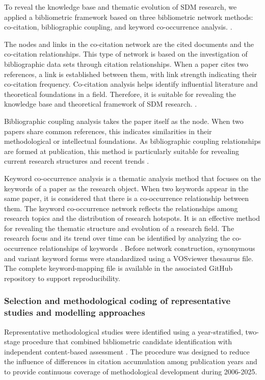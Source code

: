 \documentclass[authoryear,preprint,review,12pt]{elsarticle}
\begin{document}
To reveal the knowledge base and thematic evolution of SDM research, we applied a bibliometric framework based on three bibliometric network methods: co-citation, bibliographic coupling, and keyword co-occurrence analysis. \citep{chen2017science,van2010software,van2014visualizing}.

The nodes and links in the co-citation network are the cited documents and the co-citation relationships. This type of network is based on the investigation of bibliographic data sets through citation relationships. When a paper cites two references, a link is established between them, with link strength indicating their co-citation frequency. Co-citation analysis helps identify influential literature and theoretical foundations in a field. Therefore, it is suitable for revealing the knowledge base and theoretical framework of SDM research. \citep{garfield2002algorithmic,garfield2009science}.

Bibliographic coupling analysis takes the paper itself as the node. When two papers share common references, this indicates similarities in their methodological or intellectual foundations. As bibliographic coupling relationships are formed at publication, this method is particularly suitable for revealing current research structures and recent trends \citep{chen2017science,kessler1963bibliographic}.

Keyword co-occurrence analysis is a thematic analysis method that focuses on the keywords of a paper as the research object. When two keywords appear in the same paper, it is considered that there is a co-occurrence relationship between them. The keyword co-occurrence network reflects the relationships among research topics and the distribution of research hotspots. It is an effective method for revealing the thematic structure and evolution of a research field. The research focus and its trend over time can be identified by analyzing the co-occurrence relationships of keywords \citep{aria2017bibliometrix}. Before network construction, synonymous and variant keyword forms were standardized using a VOSviewer thesaurus file. The complete keyword-mapping file is available in the associated GitHub repository to support reproducibility.

\subsubsection{Selection and methodological coding of representative studies and modelling approaches}

Representative methodological studies were identified using a year-stratified, two-stage procedure that combined bibliometric candidate identification with independent content-based assessment \citep{zupic2015bibliometric, donthu2021conduct, linnenluecke2020conducting}. The procedure was designed to reduce the influence of differences in citation accumulation among publication years and to provide continuous coverage of methodological development during 2006-2025.
\end{document}

